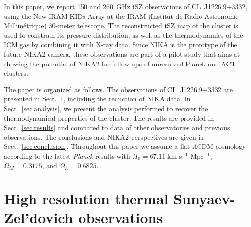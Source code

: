 \documentclass[twocolumn,traditabstract]{aa}
\begin{document}
In this paper, we report 150 and 260~GHz tSZ observations of \mbox{CL~J1226.9+3332}, using the New IRAM KIDs Array \citep[NIKA, see][for more details on the NIKA camera]{monfardini2010,bourion2011,monfardini2011,calvo2012,adam2013,catalano2014} at the IRAM (Institut de Radio Astronomie Millim\'etrique) 30-meter telescope. The reconstructed tSZ map of the cluster is used to constrain its pressure distribution, as well as the thermodynamics of the ICM gas by combining it with X-ray data. Since NIKA is the prototype of the future NIKA2 camera, these observations are part of a pilot study that aims at showing the potential of NIKA2 for follow-ups of unresolved Planck and ACT clusters. 

The paper is organized as follows. The observations of \mbox{CL~J1226.9+3332} are presented in Sect.~\ref{sec:CL1227Obs}, including the reduction of NIKA data. In Sect.~\ref{sec:analysis}, we present the analysis performed to recover the thermodynamical properties of the cluster. The results are provided in Sect.~\ref{sec:results} and compared to {data of other observatories} and previous observations. The conclusions and NIKA2 perspectives are given in Sect.~\ref{sec:conclusion}. Throughout this paper we assume a flat $\Lambda$CDM cosmology according to the latest {\it Planck} results \citep{planck2013param} with $H_0 = 67.11$ km s$^{-1}$ Mpc$^{-1}$, $\Omega_M = 0.3175$, and $\Omega_{\Lambda} = 0.6825$.

\section{High resolution thermal Sunyaev-Zel'dovich observations}\label{sec:CL1227Obs}
\end{document}
